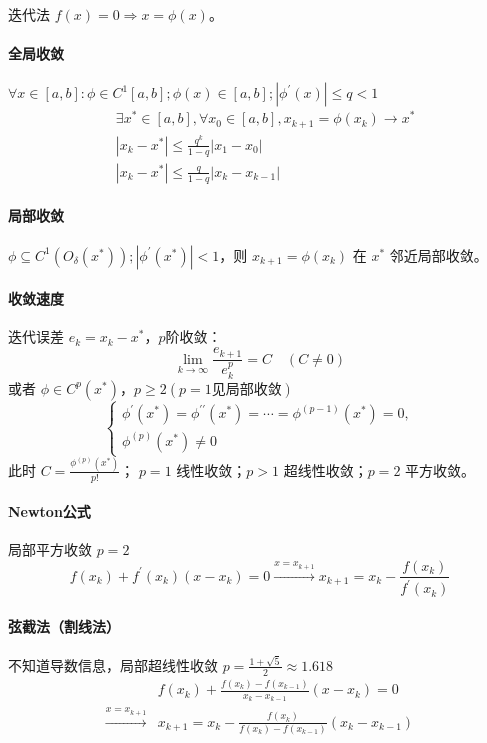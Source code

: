 \documentclass[twocolumn]{ctexart}
\begin{document}
迭代法 $f(x)=0\Rightarrow x=\phi(x)$。

\paragraph{全局收敛} 

$\forall x\in [a,b]: \phi\in C^1[a,b]; \phi(x)\in [a,b]; |\phi^\prime(x)|\leq q<1$
\begin{align*}
    &\exists x^*\in[a,b],\forall x_0\in[a,b],x_{k+1}=\phi(x_k)\rightarrow x^* \\
    & |x_k-x^*|\leq \frac{q^k}{1-q}|x_1-x_0|\\
    & |x_k-x^*|\leq \frac{q}{1-q}|x_k-x_{k-1}|
\end{align*}

\paragraph{局部收敛}

$\phi\subseteq C^1(O_\delta(x^*)); |\phi^\prime(x^*)|<1$，则 $x_{k+1}=\phi(x_k)$ 在 $x^*$ 邻近局部收敛。

\paragraph{收敛速度} 迭代误差 $e_k=x_k-x^*$，$p$阶收敛：
\begin{equation*}
    \lim_{k\rightarrow\infty}\frac{e_{k+1}}{e_k^p}=C\quad (C\neq 0)
\end{equation*}
或者 $\phi\in C^{p}(x^*)$，$p\geq 2 (p=1\text{见局部收敛})$
\begin{equation*}
    \begin{cases}
        \phi^\prime(x^*)=\phi^{\prime\prime}(x^*)=\cdots=\phi^{(p-1)}(x^*)=0,\\
        \phi^{(p)}(x^*)\neq 0
    \end{cases}
\end{equation*}此时 $C=\frac{\phi^{(p)}(x^*)}{p!}$；
$p=1$ 线性收敛；$p>1$ 超线性收敛；$p=2$ 平方收敛。

\paragraph{Newton公式} 局部平方收敛 $p=2$ \begin{equation*}
    f(x_k)+f^\prime(x_k)(x-x_k)=0\xrightarrow{x=x_{k+1}} x_{k+1}=x_k-\frac{f(x_k)}{f^\prime(x_k)}
\end{equation*}

\paragraph{弦截法（割线法）} 不知道导数信息，局部超线性收敛 $p=\frac{1+\sqrt{5}}{2}\approx  1.618$\begin{align*}
    &f(x_k)+\frac{f(x_k)-f(x_{k-1})}{x_k-x_{k-1}}(x-x_k)=0\\
    \xrightarrow{x=x_{k+1}}& x_{k+1}=x_k-\frac{f(x_k)}{f(x_k)-f(x_{k-1})}(x_k-x_{k-1})
\end{align*}
\end{document}
